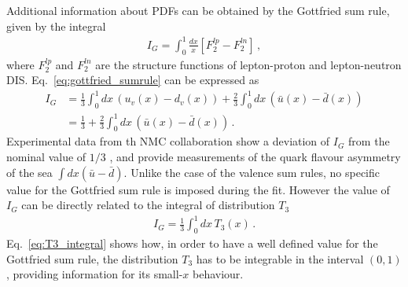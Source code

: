 %
Additional information about PDFs can be obtained by the Gottfried sum rule, given by the integral
\begin{align}
    \label{eq:gottfried_sumrule}
    I_G = \int_0^1 \frac{dx}{x} \left[F_2^{lp} - F_2^{ln}\right]\,,
\end{align}
where $F_2^{lp}$ and $F_2^{ln}$ are the structure functions of lepton-proton and lepton-neutron DIS.
Eq.~\eqref{eq:gottfried_sumrule} can be expressed as
\begin{align}
    \label{eq:gottfried_sumrule_1}
    I_G &= \frac{1}{3}\int_0^1 dx\,\left(u_v\left(x\right) - d_v\left(x\right)\right) 
    + \frac{2}{3}\int_0^1 dx\,\left(\bar{u}\left(x\right) - \bar{d}\left(x\right)\right) \nonumber \\
    & = \frac{1}{3} + \frac{2}{3}\int_0^1 dx\,\left(\bar{u}\left(x\right) - \bar{d}\left(x\right)\right)\,. 
\end{align}
Experimental data from th NMC collaboration show a deviation of $I_G$
from the nominal value of $1/3$ \cite{Amaudruz:1991at},
and provide measurements of the quark flavour asymmetry of the sea $\int dx \left(\bar{u} - \bar{d}\right)$.
Unlike the case of the valence sum rules, no specific value for the Gottfried sum rule is imposed
during the fit.
However the value of $I_G$ can be directly related to the integral of distribution $T_3$ 
\begin{align}
    \label{eq:T3_integral}
    I_G = \frac{1}{3}\int_0^1 dx\, T_3\left(x\right)\,. 
\end{align}
Eq.~\eqref{eq:T3_integral} shows how, in order to have a well defined value for the Gottfried sum rule,
the distribution $T_3$ has to be integrable in the interval $\left(0,1\right)$, 
providing information for its small-$x$ behaviour.



